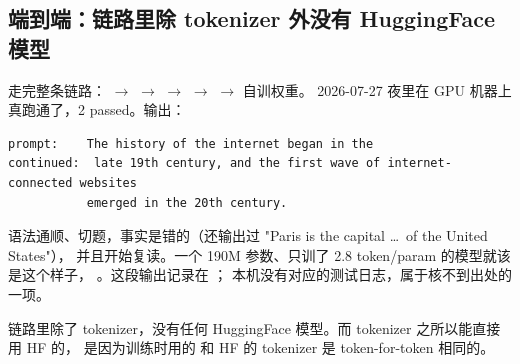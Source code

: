 \subsection{端到端：链路里除 tokenizer 外没有 HuggingFace 模型}
\label{sec:b-kv-e2e}

 走完整条链路：
 $\to$  $\to$  $\to$
 $\to$  $\to$ 自训权重。
2026-07-27 夜里在 GPU 机器上真跑通了，2 passed。输出：

\begin{lstlisting}[style=hlshell]
prompt:    The history of the internet began in the
continued:  late 19th century, and the first wave of internet-connected websites
           emerged in the 20th century.
\end{lstlisting}

语法通顺、切题，事实是错的（还输出过 "Paris is the capital \ldots\ of the United States"），
并且开始复读。一个 190M 参数、只训了 2.8 token/param 的模型就该是这个样子，
。这段输出记录在 ；
本机没有对应的测试日志，属于核不到出处的一项。

链路里除了 tokenizer，没有任何 HuggingFace 模型。而 tokenizer 之所以能直接用 HF 的，
是因为训练时用的  和 HF 的  tokenizer
是 token-for-token 相同的。

